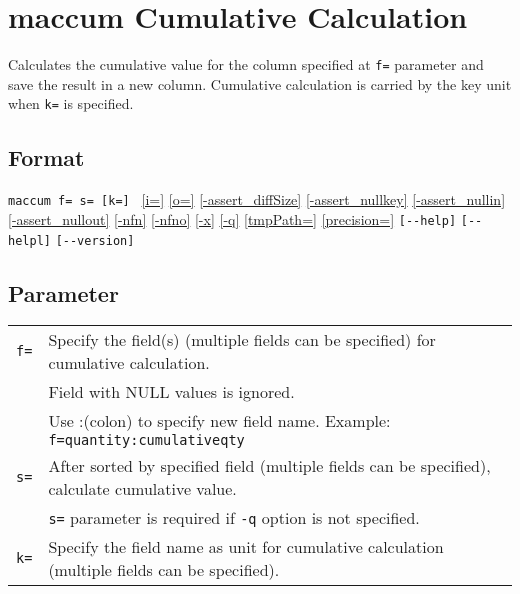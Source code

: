 
%

\section{maccum Cumulative Calculation\label{sect:maccum}}
Calculates the cumulative value for the column specified at \verb|f=| parameter and save the result in a new column. 
Cumulative calculation is carried by the key unit when \verb|k=| is specified. 

\subsection*{Format}
\verb|maccum f= s= [k=] |
\hyperref[sect:option_i]{[i=]}
\hyperref[sect:option_o]{[o=]}
\hyperref[sect:option_assert_diffSize]{[-assert\_diffSize]}
\hyperref[sect:option_assert_nullkey]{[-assert\_nullkey]}
\hyperref[sect:option_assert_nullin]{[-assert\_nullin]}
\hyperref[sect:option_assert_nullout]{[-assert\_nullout]}
\hyperref[sect:option_nfn]{[-nfn]} 
\hyperref[sect:option_nfno]{[-nfno]}  
\hyperref[sect:option_x]{[-x]}
\hyperref[sect:option_q]{[-q]}
\hyperref[sect:option_option_tmppath]{[tmpPath=]}
\hyperref[sect:option_precision]{[precision=]}
\verb|[--help]|
\verb|[--helpl]|
\verb|[--version]|\\

\subsection*{Parameter}
\begin{table}[htbp]
{\small
\begin{tabular}{ll}
\verb|f=|    & Specify the field(s) (multiple fields can be specified) for cumulative calculation. \\
             & Field with NULL values is ignored. \\
             & Use :(colon) to specify new field name. Example: \verb|f=quantity:cumulativeqty| \\
\verb|s=|    & After sorted by specified field (multiple fields can be specified), calculate cumulative value.\\
             & \verb|s=| parameter is required if \verb|-q| option is not specified. \\
\verb|k=|    & Specify the field name as unit for cumulative calculation (multiple fields can be specified). \\
\end{tabular} 
}
\end{table} 

